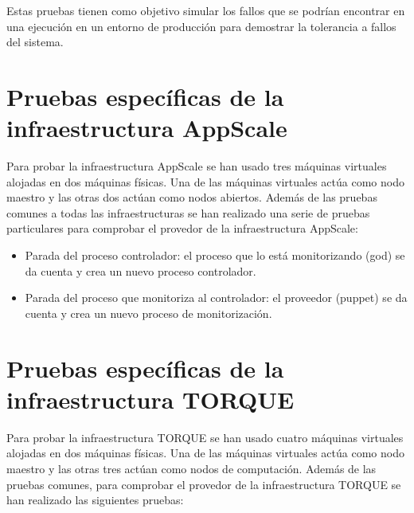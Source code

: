 Estas pruebas tienen como objetivo simular los fallos que se podrían encontrar en una ejecución en un entorno de producción para demostrar la tolerancia a fallos del sistema.


\section{Pruebas específicas de la infraestructura AppScale}

Para probar la infraestructura AppScale se han usado tres máquinas virtuales alojadas en dos máquinas físicas. Una de las máquinas virtuales actúa como nodo maestro y las otras dos actúan como nodos abiertos. Además de las pruebas comunes a todas las infraestructuras se han realizado una serie de pruebas particulares para comprobar el provedor de la infraestructura AppScale:

\begin{itemize}
\item Parada del proceso controlador: el proceso que lo está monitorizando (god) se da cuenta y crea un nuevo proceso controlador.
\item Parada del proceso que monitoriza al controlador: el proveedor (puppet) se da cuenta y crea un nuevo proceso de monitorización.
\end{itemize}


\section{Pruebas específicas de la infraestructura TORQUE}

Para probar la infraestructura TORQUE se han usado cuatro máquinas virtuales alojadas en dos máquinas físicas. Una de las máquinas virtuales actúa como nodo maestro y las otras tres actúan como nodos de computación. Además de las pruebas comunes, para comprobar el provedor de la infraestructura TORQUE se han realizado las siguientes pruebas:

